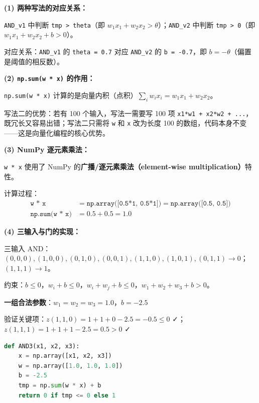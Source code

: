 \documentclass[a4paper,11pt]{ctexart}
\begin{document}
\begin{solutionbox}[参考答案与详细解析]
    \textbf{(1) 两种写法的对应关系：}

    \texttt{AND\_v1} 中判断 \texttt{tmp > theta}（即 $w_1 x_1 + w_2 x_2 > \theta$）；\texttt{AND\_v2} 中判断 \texttt{tmp > 0}（即 $w_1 x_1 + w_2 x_2 + b > 0$）。

    对应关系：\texttt{AND\_v1} 的 \texttt{theta = 0.7} 对应 \texttt{AND\_v2} 的 \texttt{b = -0.7}，即 $b = -\theta$（偏置是阈值的相反数）。

    \textbf{(2) \texttt{np.sum(w * x)} 的作用：}

    \texttt{np.sum(w * x)} 计算的是向量内积（点积）$\sum_i w_i x_i = w_1 x_1 + w_2 x_2$。

    写法二的优势：若有 100 个输入，写法一需要写 100 项 \texttt{x1*w1 + x2*w2 + ...}，既冗长又容易出错；写法二只需将 \texttt{w} 和 \texttt{x} 改为长度 100 的数组，代码本身不变——这是向量化编程的核心优势。

    \textbf{(3) NumPy 逐元素乘法：}

    \texttt{w * x} 使用了 NumPy 的\textbf{广播/逐元素乘法（element-wise multiplication）}特性。

    计算过程：
    \begin{align*}
    \texttt{w * x} &= \texttt{np.array([0.5*1,\ 0.5*1])} = \texttt{np.array([0.5,\ 0.5])} \\
    \texttt{np.sum(w * x)} &= 0.5 + 0.5 = 1.0
    \end{align*}

    \textbf{(4) 三输入与门的实现：}

    三输入 AND：$(0,0,0),(1,0,0),(0,1,0),(0,0,1),(1,1,0),(1,0,1),(0,1,1) \to 0$；$(1,1,1) \to 1$。

    约束：$b \leq 0$，$w_i + b \leq 0$，$w_i + w_j + b \leq 0$，$w_1 + w_2 + w_3 + b > 0$。

    \textbf{一组合法参数}：$w_1 = w_2 = w_3 = 1.0$，$b = -2.5$

    验证关键项：$z(1,1,0) = 1+1+0-2.5 = -0.5 \leq 0$ ✓；$z(1,1,1) = 1+1+1-2.5 = 0.5 > 0$ ✓

    \begin{lstlisting}[language=Python]
def AND3(x1, x2, x3):
    x = np.array([x1, x2, x3])
    w = np.array([1.0, 1.0, 1.0])
    b = -2.5
    tmp = np.sum(w * x) + b
    return 0 if tmp <= 0 else 1
    \end{lstlisting}
\end{solutionbox}
\end{document}
